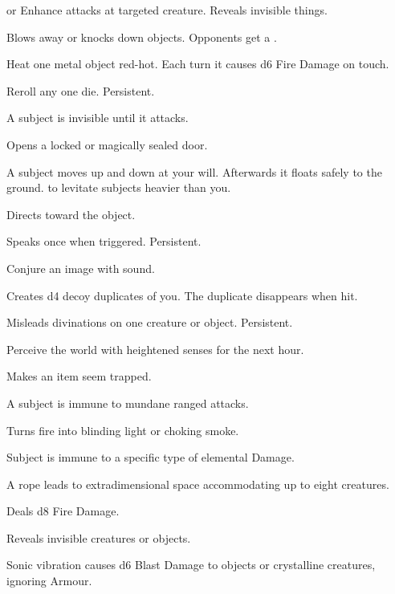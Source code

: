 \documentclass[itdr]{subfiles}
\begin{document}
\begin{enumerate}
	\item {}  or Enhance attacks at targeted creature. Reveals invisible things.
	\item {} Blows away or knocks down objects. Opponents get a .
	\item {} Heat one metal object red-hot. Each turn it causes d6 Fire Damage on touch.
	\item {} Reroll any one die. Persistent.
	\begin{minipage}{\columnwidth}
	\item {} A subject is invisible until it attacks.
	\end{minipage}
	\item {} Opens a locked or magically sealed door.
	\item {} A subject moves up and down at your will. Afterwards it floats safely to the ground.  to levitate subjects heavier than you.
	\item {} Directs toward the object.
	\item {} Speaks once when triggered. Persistent.
	\item {} Conjure an image with sound.
	\item {} Creates d4 decoy duplicates of you. The duplicate disappears when hit.
	\item {} Misleads divinations on one creature or object. Persistent.
	\item {} Perceive the world with heightened senses for the next hour.
	\item {} Makes an item seem trapped.
	\item {} A subject is immune to mundane ranged attacks.
	\item {} Turns fire into blinding light or choking smoke.
	\item {} Subject is immune to a specific type of elemental Damage.
	\item {} A rope leads to extradimensional space accommodating up to eight creatures.
	\item {} Deals d8 Fire Damage.
	\item {} Reveals invisible creatures or objects.
	\item {} Sonic vibration causes d6 Blast Damage to objects or crystalline creatures, ignoring Armour.

\end{enumerate}
\end{document}

